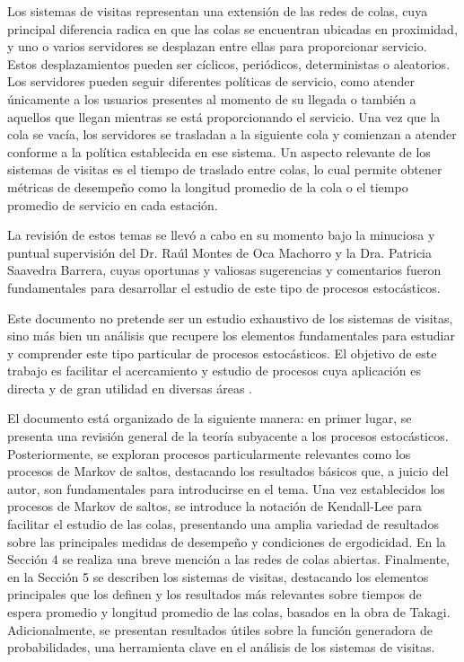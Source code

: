 \documentclass{article}
\numberwithin{equation}{section}
\begin{document}
Los sistemas de visitas \cite{Semenova} representan una extensi\'on de las redes de colas, cuya principal diferencia radica en que las colas se encuentran ubicadas en proximidad, y uno o varios servidores se desplazan entre ellas para proporcionar servicio. Estos desplazamientos pueden ser c\'iclicos, peri\'odicos, deterministas o aleatorios. Los servidores pueden seguir diferentes pol\'iticas de servicio, como atender \'unicamente a los usuarios presentes al momento de su llegada o tambi\'en a aquellos que llegan mientras se est\'a proporcionando el servicio. Una vez que la cola se vac\'ia, los servidores se trasladan a la siguiente cola y comienzan a atender conforme a la pol\'itica establecida en ese sistema. Un aspecto relevante de los sistemas de visitas es el tiempo de traslado entre colas, lo cual permite obtener m\'etricas de desempe\~no como la longitud promedio de la cola o el tiempo promedio de servicio en cada estaci\'on.

La revisi\'on de estos temas se llev\'o a cabo en su momento bajo la minuciosa y puntual supervisi\'on del Dr. Ra\'ul Montes de Oca Machorro y la Dra. Patricia Saavedra Barrera, cuyas oportunas y valiosas sugerencias y comentarios fueron fundamentales para desarrollar el estudio de este tipo de procesos estoc\'asticos.

Este documento no pretende ser un estudio exhaustivo de los sistemas de visitas, sino m\'as bien un an\'alisis que recupere los elementos fundamentales para estudiar y comprender este tipo particular de procesos estoc\'asticos. El objetivo de este trabajo es facilitar el acercamiento y estudio de procesos cuya aplicaci\'on es directa y de gran utilidad en diversas \'areas \cite{Semenova,LevySidi}.

El documento est\'a organizado de la siguiente manera: en primer lugar, se presenta una revisi\'on general de la teor\'ia subyacente a los procesos estoc\'asticos. Posteriormente, se exploran procesos particularmente relevantes como los procesos de Markov de saltos, destacando los resultados b\'asicos que, a juicio del autor, son fundamentales para introducirse en el tema. Una vez establecidos los procesos de Markov de saltos, se introduce la notaci\'on de Kendall-Lee para facilitar el estudio de las colas, presentando una amplia variedad de resultados sobre las principales medidas de desempe\~no y condiciones de ergodicidad. En la Secci\'on 4 se realiza una breve menci\'on a las redes de colas abiertas. Finalmente, en la Secci\'on 5 se describen los sistemas de visitas, destacando los elementos principales que los definen y los resultados m\'as relevantes sobre tiempos de espera promedio y longitud promedio de las colas, basados en la obra de Takagi. Adicionalmente, se presentan resultados \'utiles sobre la funci\'on generadora de probabilidades, una herramienta clave en el an\'alisis de los sistemas de visitas.
\end{document}
